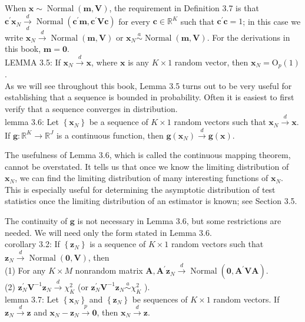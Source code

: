 \documentclass[10pt]{article}
\begin{document}
When $\mathbf{x} \sim \operatorname{Normal}(\mathbf{m}, \mathbf{V})$, the requirement in Definition 3.7 is that $\mathbf{c}^{\prime} \mathbf{x}_{N} \xrightarrow[d]{d} \operatorname{Normal}\left(\mathbf{c}^{\prime} \mathbf{m}, \mathbf{c}^{\prime} \mathbf{V c}\right)$ for every $\mathbf{c} \in \mathbb{R}^{K}$ such that $\mathbf{c}^{\prime} \mathbf{c}=1$; in this case we write $\mathbf{x}_{N} \xrightarrow{d} \operatorname{Normal}(\mathbf{m}, \mathbf{V})$ or $\mathbf{x}_{N} \stackrel{a}{\sim} \operatorname{Normal}(\mathbf{m}, \mathbf{V})$. For the derivations in this book, $\mathbf{m}=\mathbf{0}$.\\
LEMMA 3.5: If $\mathbf{x}_{N} \xrightarrow{d} \mathbf{x}$, where $\mathbf{x}$ is any $K \times 1$ random vector, then $\mathbf{x}_{N}=\mathrm{O}_{p}(1)$.\\
As we will see throughout this book, Lemma 3.5 turns out to be very useful for establishing that a sequence is bounded in probability. Often it is easiest to first verify that a sequence converges in distribution.\\
lemma 3.6: Let $\left\{\mathbf{x}_{N}\right\}$ be a sequence of $K \times 1$ random vectors such that $\mathbf{x}_{N} \xrightarrow{d} \mathbf{x}$. If $\mathbf{g}: \mathbb{R}^{K} \rightarrow \mathbb{R}^{J}$ is a continuous function, then $\mathbf{g}\left(\mathbf{x}_{N}\right) \xrightarrow{d} \mathbf{g}(\mathbf{x})$.

The usefulness of Lemma 3.6, which is called the continuous mapping theorem, cannot be overstated. It tells us that once we know the limiting distribution of $\mathbf{x}_{N}$, we can find the limiting distribution of many interesting functions of $\mathbf{x}_{N}$. This is especially useful for determining the asymptotic distribution of test statistics once the limiting distribution of an estimator is known; see Section 3.5.

The continuity of $\mathbf{g}$ is not necessary in Lemma 3.6, but some restrictions are needed. We will need only the form stated in Lemma 3.6.\\
corollary 3.2: If $\left\{\mathbf{z}_{N}\right\}$ is a sequence of $K \times 1$ random vectors such that $\mathbf{z}_{N} \xrightarrow{d} \operatorname{Normal}(\mathbf{0}, \mathbf{V})$, then\\
(1) For any $K \times M$ nonrandom matrix $\mathbf{A}, \mathbf{A}^{\prime} \mathbf{z}_{N} \xrightarrow{d} \operatorname{Normal}\left(\mathbf{0}, \mathbf{A}^{\prime} \mathbf{V A}\right)$.\\
(2) $\mathbf{z}_{N}^{\prime} \mathbf{V}^{-1} \mathbf{z}_{N} \xrightarrow{d} \chi_{K}^{2}$ (or $\mathbf{z}_{N}^{\prime} \mathbf{V}^{-1} \mathbf{z}_{N} \stackrel{a}{\sim} \chi_{K}^{2}$ ).\\
lemma 3.7: Let $\left\{\mathbf{x}_{N}\right\}$ and $\left\{\mathbf{z}_{N}\right\}$ be sequences of $K \times 1$ random vectors. If $\mathbf{z}_{N} \xrightarrow{d} \mathbf{z}$ and $\mathbf{x}_{N}-\mathbf{z}_{N} \xrightarrow{p} \mathbf{0}$, then $\mathbf{x}_{N} \xrightarrow{d} \mathbf{z}$.
\end{document}
